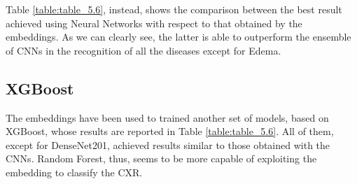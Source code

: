 Table \ref{table:table_5.6}, instead, shows the comparison between the best result achieved using Neural Networks with respect to that obtained by the embeddings. As we can clearly see, the latter is able to outperform the ensemble of \acp{CNN} in the recognition of all the diseases except for Edema.

\begin{table}[h!]
\centering
{}
\caption[CNNs and RF Embedding comparison]{AUROC values comparison between CNNs and RFs trained using embedding. For each label, the highest AUROC is boldfaced.}
\label{table:table_5.6}
\end{table}


\subsection{XGBoost}

The embeddings have been used to trained another set of models, based on XGBoost, whose results are reported in Table \ref{table:table_5.6}. All of them, except for DenseNet201, achieved results similar to those obtained with the \acp{CNN}. Random Forest, thus, seems to be more capable of exploiting the embedding to classify the \ac{CXR}.



